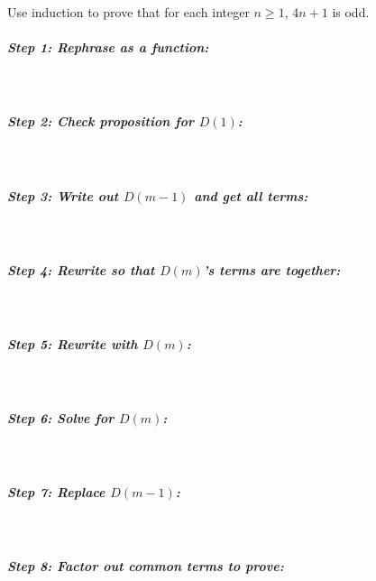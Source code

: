 \documentclass[a4paper,12pt]{book}
\newcounter{question}
\begin{document}
        \begin{questionNOGRADE}{\thequestion}
            Use induction to prove that for each integer $n \geq 1$, $4n+1$ is odd.

            \subparagraph{Step 1: Rephrase as a function:} ~\\
            
            \subparagraph{Step 2: Check proposition for $D(1)$:} ~\\

            \subparagraph{Step 3: Write out $D(m-1)$ and get all terms:} ~\\      

            \subparagraph{Step 4: Rewrite so that $D(m)$'s terms are together:} ~\\

            \subparagraph{Step 5: Rewrite with $D(m)$:}~\\

            \subparagraph{Step 6: Solve for $D(m)$:}~\\

            \subparagraph{Step 7: Replace $D(m-1)$:}~\\

            \subparagraph{Step 8: Factor out common terms to prove:}~\\
        \end{questionNOGRADE}
\end{document}
